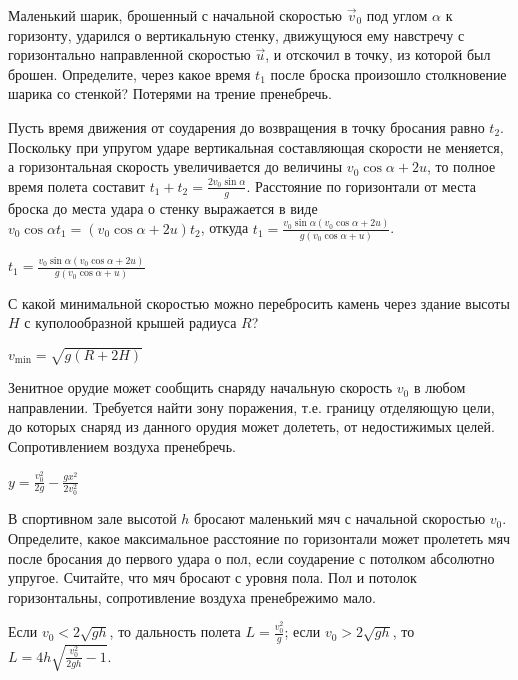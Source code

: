 \begin{ex}
Маленький шарик, брошенный с начальной скоростью $\vec{v}_0$ под углом $\alpha$ к горизонту, 
ударился о вертикальную стенку, движущуюся ему навстречу с горизонтально направленной скоростью $\vec u$, и отскочил в точку, из которой был брошен. 
Определите, через какое время $t_1$ после броска произошло столкновение шарика со стенкой? Потерями на трение пренебречь.
\begin{sol}
Пусть время движения от соударения до возвращения в точку бросания равно $t_2$. Поскольку при упругом ударе вертикальная составляющая скорости не меняется, а горизонтальная скорость увеличивается до величины $v_0 \cos \alpha + 2u$, то полное время полета составит $t_1 + t_2 = \frac{2v_0 \sin \alpha}{g}$. Расстояние по горизонтали от места броска до места удара о стенку выражается в виде $v_0 \cos \alpha t_1 = (v_0 \cos \alpha +2u)t_2$, откуда $t_1 = \frac{v_0 \sin \alpha (v_0 \cos \alpha + 2u)}{g(v_0 \cos \alpha + u)}$.
\end{sol}
\begin{ans}
$t_1 = \frac{v_0 \sin \alpha (v_0 \cos \alpha + 2u)}{g(v_0 \cos \alpha + u)}$
\end{ans}
\end{ex}

\begin{ex}
С какой минимальной скоростью можно перебросить камень через здание высоты $H$ с куполообразной крышей радиуса $R$?
\begin{ans}
$v_{\min} = \sqrt{g(R+2H)}$
\end{ans}
\end{ex}

\begin{ex}
Зенитное орудие может сообщить снаряду начальную скорость $v_0$ в любом направлении. Требуется найти зону поражения, т.е. границу отделяющую цели, до которых снаряд из данного орудия может долететь, от недостижимых целей. Сопротивлением воздуха пренебречь. 
\begin{ans}
$y = \frac{v_0^2}{2g} - \frac{gx^2}{2v_0^2}$
\end{ans}
\end{ex}

\begin{ex}
В спортивном зале высотой $h$ бросают маленький мяч с начальной скоростью $v_0$. Определите, какое максимальное расстояние по горизонтали может пролететь мяч после бросания до первого удара о пол, если соударение с потолком абсолютно упругое. Считайте, что мяч бросают с уровня пола. Пол и потолок горизонтальны, сопротивление воздуха пренебрежимо мало.
\begin{ans}
Если $v_0 < 2 \sqrt{gh}$, то дальность полета $L = \frac{v_0^2}{g}$; если $v_0 > 2 \sqrt{gh}$, то $L = 4h \sqrt{\frac{v_0^2}{2gh}-1}$.
\end{ans}
\end{ex}

